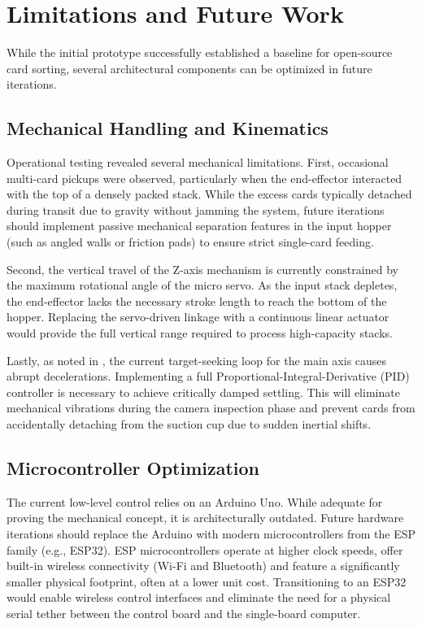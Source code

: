 \section{Limitations and Future Work}
While the initial prototype successfully established a baseline for open-source card sorting, several architectural components can be optimized in future iterations.

\subsection{Mechanical Handling and Kinematics}
Operational testing revealed several mechanical limitations. First, occasional multi-card pickups were observed, particularly when the end-effector interacted with the top of a densely packed stack. While the excess cards typically detached during transit due to gravity without jamming the system, future iterations should implement passive mechanical separation features in the input hopper (such as angled walls or friction pads) to ensure strict single-card feeding.

Second, the vertical travel of the Z-axis mechanism is currently constrained by the maximum rotational angle of the micro servo. As the input stack depletes, the end-effector lacks the necessary stroke length to reach the bottom of the hopper. Replacing the servo-driven linkage with a continuous linear actuator would provide the full vertical range required to process high-capacity stacks. 

Lastly, as noted in , the current target-seeking loop for the main axis causes abrupt decelerations. Implementing a full Proportional-Integral-Derivative (PID) controller is necessary to achieve critically damped settling. This will eliminate mechanical vibrations during the camera inspection phase and prevent cards from accidentally detaching from the suction cup due to sudden inertial shifts.

\subsection{Microcontroller Optimization}
The current low-level control relies on an Arduino Uno. While adequate for proving the mechanical concept, it is architecturally outdated. Future hardware iterations should replace the Arduino with modern microcontrollers from the ESP family (e.g., ESP32). ESP microcontrollers operate at higher clock speeds, offer built-in wireless connectivity (Wi-Fi and Bluetooth) and feature a significantly smaller physical footprint, often at a lower unit cost. Transitioning to an ESP32 would enable wireless control interfaces and eliminate the need for a physical serial tether between the control board and the single-board computer.

